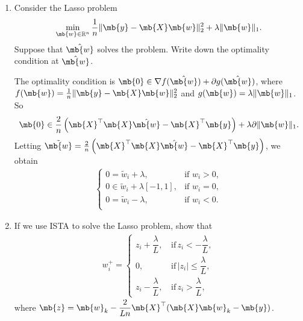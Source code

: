 \begin{exercise}
\begin{enumerate}[resume]
\begin{solution}
            \end{solution}
        \item Consider the Lasso problem
            \begin{align*}
                \min_{\mb{w}\in\mathbb{R}^n} \frac{1}{n} \|\mb{y}-\mb{X}\mb{w}\|_2^2+\lambda\|\mb{w}\|_1.
            \end{align*}
            Suppose that $\hat{\mb{w}}$ solves the problem. Write down the optimality condition at $\hat{\mb{w}}$.

            \begin{solution}
                The optimality condition is $\mb{0} \in \nabla f(\hat{\mb{w}}) + \partial g(\hat{\mb{w}})$, where $f(\mb{w}) = \frac{1}{n} \|\mb{y}-\mb{X}\mb{w}\|_2^2$ and $g(\mb{w}) = \lambda\|\mb{w}\|_1$. So
                \begin{align*}
                    \mb{0} \in \frac{2}{n}\left(\mb{X}^\top\mb{X}\hat{\mb{w}}-\mb{X}^\top\mb{y}\right)+\lambda\partial\|\mb{w}\|_1.
                \end{align*}
                Letting $\tilde{\mb{w}} = \frac{2}{n}\left(\mb{X}^\top\mb{X}\hat{\mb{w}}-\mb{X}^\top\mb{y}\right)$, we obtain
                \begin{align*}
                    \begin{cases}
                        0 = \tilde{w}_i + \lambda,           & \text{if } \hat{w}_i > 0, \\
                        0 \in \tilde{w}_i + \lambda [-1, 1], & \text{if } \hat{w}_i = 0, \\
                        0 = \tilde{w}_i - \lambda,           & \text{if } \hat{w}_i < 0. \\
                    \end{cases}
                    \tag*{\qedhere}
                \end{align*}
            \end{solution}
        \item If we use ISTA to solve the Lasso problem, show that
            \begin{align*}
                w_i^+=
                \begin{cases}
                    z_i+\dfrac{\lambda}{L},\, & \text{if}\,z_i<-\dfrac{\lambda}{L},    \\
                    0,\,                      & \text{if}\,|z_i|\le\dfrac{\lambda}{L}, \\
                    z_i-\dfrac{\lambda}{L},\, & \text{if}\,z_i>\dfrac{\lambda}{L},
                \end{cases}
            \end{align*}
            where $\mb{z}=\mb{w}_k-\dfrac{2}{Ln}\mb{X}^\top(\mb{X}\mb{w}_k-\mb{y})$.


\end{enumerate}
\end{exercise}
